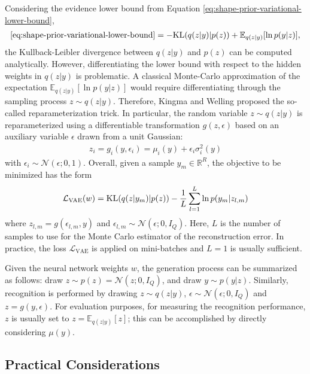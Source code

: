 Considering the evidence lower bound from Equation
\eqref{eq:shape-prior-variational-lower-bound}, \ie
\begin{align}
  \eqref{eq:shape-prior-variational-lower-bound}
  = - \mathrm{KL}(q(z|y)|p(z)) + \mathbb{E}_{q(z|y)}[\ln p(y|z)],
\end{align}
the Kullback-Leibler divergence between $q(z|y)$
and $p(z)$ can be computed analytically. However, differentiating the lower
bound with respect to the hidden weights in $q(z|y)$ is problematic.
A classical Monte-Carlo approximation of the expectation $\mathbb{E}_{q(z|y)}[\ln p(y|z)]$
would require differentiating through the sampling process $z \sim q(z | y)$.
Therefore, Kingma and Welling \cite{KingmaWelling:2013} proposed
the so-called reparameterization trick. In particular,
the random variable $z \sim q(z|y)$ is reparameterized using a
differentiable transformation $g(z, \epsilon)$ based on an auxiliary
variable $\epsilon$ drawn from a unit Gaussian:
\begin{align}
	z_i = g_i(y, \epsilon_i) = \mu_i(y) + \epsilon_i \sigma_i^2(y)
\end{align}
with $\epsilon_i \sim \mathcal{N}(\epsilon; 0, 1)$.
Overall, given a sample
$y_m \in \mathbb{R}^R$, the objective to be minimized has the form
\begin{align}
	\mathcal{L}_{\text{VAE}} (w) = \mathrm{KL}(q(z|y_m) | p(z))
	- \frac{1}{L}\sum_{l = 1}^L \ln p(y_m | z_{l,m})\label{eq:shape-prior-variational-auto-encoder-objective}
\end{align}
where $z_{l,m} = g(\epsilon_{l,m}, y)$ and $\epsilon_{l,m} \sim \mathcal{N}(\epsilon ; 0, I_Q)$.
Here, $L$ is the number of samples to use for the Monte Carlo estimator of the
reconstruction error. In practice, the loss $\mathcal{L}_{\text{VAE}}$ is applied on
mini-batches and $L = 1$ is usually sufficient.

Given the neural network weights $w$, the generation process can be
summarized as follows: draw $z \sim p(z) = \mathcal{N}(z ; 0,I_Q)$,
and draw $y \sim p(y|z)$. Similarly, recognition is performed by
drawing $z \sim q(z|y)$, \ie $\epsilon \sim \mathcal{N}(\epsilon ; 0,I_Q)$
and $z = g(y,\epsilon)$. For evaluation purposes, \ie for
measuring the recognition performance, $z$ is usually set to
$z = \mathbb{E}_{q(z|y)}[z]$; this can be accomplished
by directly considering $\mu(y)$.

\subsection{Practical Considerations}

